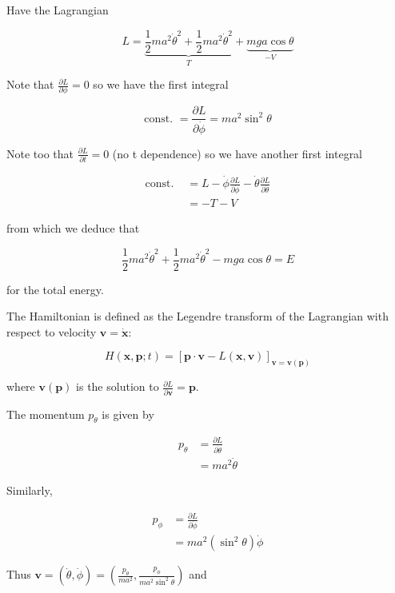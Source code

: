 \documentclass[a4paper]{article}
\begin{document}
Have the Lagrangian

\[ L = \underbrace{\frac{1}{2} m a^{2} \dot{\theta}^{2}  + \frac{1}{2} m a^{2} \dot{\theta}^{2}  }_{T} + \underbrace{mga \cos \theta}_{- V} \]

Note that $ \frac{\partial L}{\partial \phi} = 0 $ so we have the first integral

\[ \text{const. } = \frac{\partial L }{\partial \dot{\phi}} = m a^{2} \sin^{2} \theta  \]

Note too that $ \frac{\partial L }{\partial t} = 0 $ (no t dependence) so we have another first integral

\begin{align*}
\text{const. } & = L - \dot{\phi} \frac{\partial L }{\partial \dot{\phi}} - \dot{\theta} \frac{\partial L }{\partial \dot{\theta}} \\
& = - T - V
\end{align*}

from which we deduce that

\[ \frac{1}{2} m a^{2} \dot{\theta}^{2}  + \frac{1}{2} m a^{2} \dot{\theta}^{2}  - mga \cos \theta = E \]

for the total energy.

The Hamiltonian is defined as the Legendre transform of the Lagrangian with respect to velocity $ \mathbf{v} = \dot{\mathbf{x}} $:

\[ H(\mathbf{x},\mathbf{p};t)  = [ \mathbf{p} \cdot \mathbf{v}  - L(\mathbf{x},\mathbf{v}) ]_{\mathbf{v} = \mathbf{v(\mathbf{p})}} \]

where $ \mathbf{v}(\mathbf{p}) $ is the solution to $ \frac{\partial L }{\partial \mathbf{v}} = \mathbf{p} $.

The momentum $ p_{\theta} $ is given by

\begin{align*}
p_{\theta}  & = \frac{\partial  L}{\partial \dot{\theta}} \\
& = m a^{2} \dot{\theta}
\end{align*}

Similarly,

\begin{align*}
p_{\phi} & = \frac{\partial  L}{\partial \dot{\phi}}  \\
& = m a^{2} (\sin^{2} \theta ) \dot{\phi}
\end{align*}

Thus $ \mathbf{v} = (\dot{\theta},\dot{\phi}) = \left(  \frac{p_{\theta}}{ma^{2}},  \frac{p_{\phi}}{ma^{2}\sin^{2}\theta   } \right)   $ and
\end{document}
